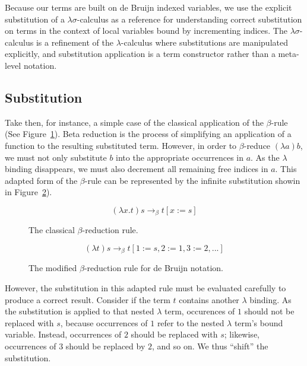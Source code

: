 Because our terms are built on de Bruijn indexed variables, we use the explicit substitution of a $\lambda\sigma$-calculus as a reference for understanding correct substitution on terms in the context of local variables bound by incrementing indices. The $\lambda\sigma$-calculus is a refinement of the $\lambda$-calculus where substitutions are manipulated explicitly, and substitution application is a term constructor rather than a meta-level notation.\cite{abadi1991}

\subsection{Substitution}
\label{sub:lambda_calc_subst}

Take then, for instance, a simple case of the classical application of the $\beta$-rule (See Figure~\ref{eq:beta_rule}). Beta reduction is the process of simplifying an application of a function to the resulting substituted term. However, in order to $\beta$-reduce $(\lambda a)b$, we must not only substitute $b$ into the appropriate occurrences in $a$. As the $\lambda$ binding disappears, we must also decrement all remaining free indices in $a$. This adapted form of the $\beta$-rule can be represented by the infinite substitution showin in Figure~\ref{eq:beta_rule2}).\cite{abadi1991}

\begin{figure}[h]
\begin{equation*}
(\lambda x.t)s \to_{\beta} t[x := s]
\end{equation*}
\caption{The classical $\beta$-reduction rule.}
\label{eq:beta_rule}
\end{figure}

\begin{figure}[h]
\begin{equation*}
(\lambda t)s \to_{\beta} t[1 := s, 2 := 1, 3 := 2, ...]
\end{equation*}
\caption{The modified $\beta$-reduction rule for de Bruijn notation.}
\label{eq:beta_rule2}
\end{figure}

However, the substitution in this adapted rule must be evaluated carefully to produce a correct result. Consider if the term $t$ contains another $\lambda$ binding. As the substitution is applied to that nested $\lambda$ term, occurences of $1$ should not be replaced with $s$, because occurrences of $1$ refer to the nested $\lambda$ term's bound variable. Instead, occurrences of $2$ should be replaced with $s$; likewise, occurrences of $3$ should be replaced by $2$, and so on. We thus ``shift'' the substitution.\cite{abadi1991}

